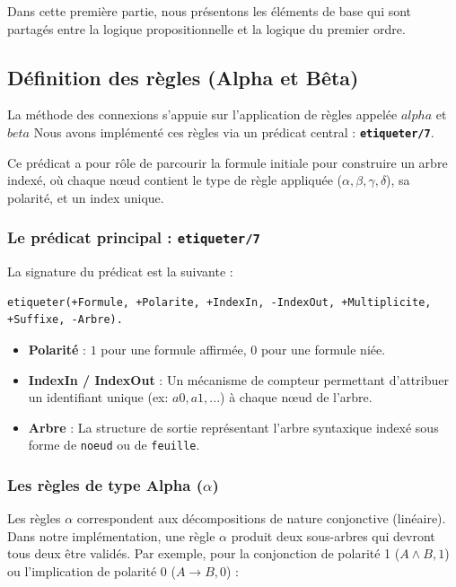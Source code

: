 \documentclass[12pt, a4paper]{article}
\begin{document}
Dans cette première partie, nous présentons les éléments de base qui sont partagés entre la logique propositionnelle et la logique du premier ordre.

\subsection{Définition des règles (Alpha et Bêta)}

La méthode des connexions s'appuie sur l'application de règles appelée $alpha$ et $beta$ Nous avons implémenté ces règles via un prédicat central : \textbf{\texttt{etiqueter/7}}.

Ce prédicat a pour rôle de parcourir la formule initiale pour construire un arbre indexé, où chaque nœud contient le type de règle appliquée ($\alpha, \beta, \gamma, \delta$), sa polarité, et un index unique.

\subsubsection{Le prédicat principal : \texttt{etiqueter/7}}

La signature du prédicat est la suivante :
\begin{lstlisting}
etiqueter(+Formule, +Polarite, +IndexIn, -IndexOut, +Multiplicite, +Suffixe, -Arbre).
\end{lstlisting}

\begin{itemize}
    \item \textbf{Polarité} : $1$ pour une formule affirmée, $0$ pour une formule niée.
    \item \textbf{IndexIn / IndexOut} : Un mécanisme de compteur permettant d'attribuer un identifiant unique (ex: $a0, a1, ...$) à chaque nœud de l'arbre.
    \item \textbf{Arbre} : La structure de sortie représentant l'arbre syntaxique indexé sous forme de \texttt{noeud} ou de \texttt{feuille}.
\end{itemize}

\subsubsection{Les règles de type Alpha ($\alpha$)}

Les règles $\alpha$ correspondent aux décompositions de nature conjonctive (linéaire). Dans notre implémentation, une règle $\alpha$ produit deux sous-arbres qui devront tous deux être validés. Par exemple, pour la conjonction de polarité 1 ($A \land B, 1$) ou l'implication de polarité 0 ($A \rightarrow B, 0$) :
\end{document}
